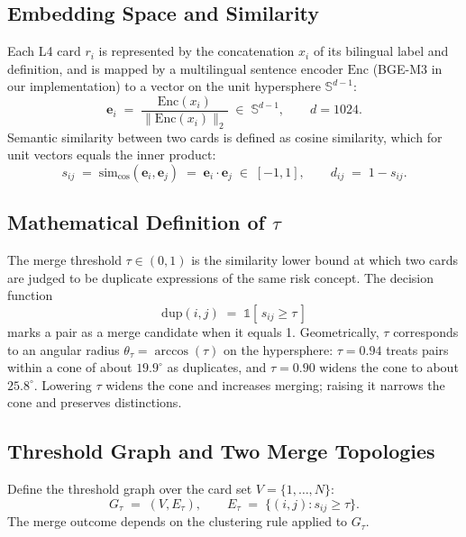 \documentclass[11pt,a4paper]{article}
\begin{document}
\subsection{Embedding Space and Similarity}

Each L4 card $r_i$ is represented by the concatenation $x_i$ of its bilingual label and definition, and is mapped by a multilingual sentence encoder $\mathrm{Enc}$ (BGE-M3 in our implementation) to a vector on the unit hypersphere $\mathbb{S}^{d-1}$:
\begin{equation}
\mathbf{e}_i \;=\; \frac{\mathrm{Enc}(x_i)}{\lVert \mathrm{Enc}(x_i) \rVert_2} \;\in\; \mathbb{S}^{d-1}, \qquad d=1024.
\end{equation}
Semantic similarity between two cards is defined as cosine similarity, which for unit vectors equals the inner product:
\begin{equation}
s_{ij} \;=\; \mathrm{sim}_{\cos}(\mathbf{e}_i,\mathbf{e}_j) \;=\; \mathbf{e}_i \cdot \mathbf{e}_j \;\in\; [-1,1],
\qquad
d_{ij} \;=\; 1 - s_{ij}.
\end{equation}

\subsection{Mathematical Definition of $\tau$}

The merge threshold $\tau \in (0,1)$ is the similarity lower bound at which two cards are judged to be duplicate expressions of the same risk concept. The decision function
\begin{equation}
\mathrm{dup}(i,j) \;=\; \mathbb{1}\!\left[\, s_{ij} \geq \tau \,\right]
\end{equation}
marks a pair as a merge candidate when it equals 1. Geometrically, $\tau$ corresponds to an angular radius $\theta_\tau = \arccos(\tau)$ on the hypersphere: $\tau=0.94$ treats pairs within a cone of about $19.9^\circ$ as duplicates, and $\tau=0.90$ widens the cone to about $25.8^\circ$. Lowering $\tau$ widens the cone and increases merging; raising it narrows the cone and preserves distinctions.

\subsection{Threshold Graph and Two Merge Topologies}

Define the threshold graph over the card set $V=\{1,\dots,N\}$:
\begin{equation}
G_\tau \;=\; (V, E_\tau), \qquad E_\tau \;=\; \{(i,j) : s_{ij} \geq \tau\}.
\end{equation}
The merge outcome depends on the clustering rule applied to $G_\tau$.
\end{document}

